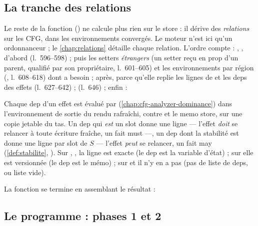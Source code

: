 \subsection{La tranche des relations}

Le reste de la fonction () ne
calcule plus rien sur le store : il dérive des \emph{relations} sur les CFG,
dans les environnements convergés. Le moteur n'est ici qu'un ordonnanceur ;
le \cref{chap:relations} détaille chaque relation. L'ordre compte :
, ,
 d'abord (l.~596--598) ; puis les setters
\emph{étrangers} (un setter reçu en prop d'un parent, qualifié par son
propriétaire, l.~601--605) et les environnements par région
(, l.~608--618) dont  a besoin ;
 après, parce qu'elle replie les lignes de
 et les deps des effets (l.~627--642) ;
 (l.~646) ; enfin  :


Chaque dep d'un effet est évalué par 
(\cref{chap:cfg-analyzer-dominance}) dans l'environnement de sortie du
rendu rafraîchi, contre  et le memo store, sur une copie
jetable du tas. Un dep qui \emph{est} un slot donne une ligne
 --- l'effet \emph{doit} se relancer à toute écriture
fraîche, un fait must ---, un dep dont la stabilité est
 donne une ligne  par slot de $S$ ---
l'effet \emph{peut} se relancer, un fait may (\cref{def:stabilite},
). Sur , ,  la ligne est exacte
(le dep est la variable d'état) ; sur  elle est versionnée
(le dep est le mémo) ; sur  et  il n'y en a pas
(pas de liste de deps, ou liste vide).

La fonction se termine en assemblant le résultat :


\subsection{Le programme : phases 1 et 2}
\label{sec:point-fixe-composant-programme}

